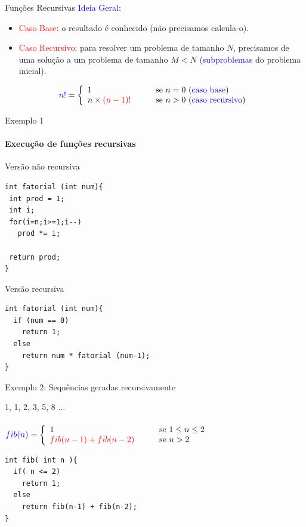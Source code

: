 \documentclass{beamer}
\newcommand{\blue}[1]{\textcolor{blue}{#1}}
\newcommand{\red}[1]{\textcolor{red}{#1}}
\begin{document}
\begin{frame}[fragile]{Funções Recursivas}
\blue{Ideia Geral}:
\begin{itemize}
 \item \red{Caso Base}: o resultado  é conhecido (não precisamos calcula-o).
 \item \red{Caso Recursivo}: para resolver um problema de tamanho $N$, precisamos de uma solução a um problema de tamanho $M<N$ (\blue{subproblemas} do problema inicial). 
\end{itemize}

\[\blue{n!} = 
 \left\{ \begin{array}{lll}
 1 & \quad& \mbox{se }n=0 \ (\mbox{\blue{caso base}})\\
 n \times \red{(n-1)!} & &\mbox{se }n > 0 \ (\mbox{\blue{caso recursivo}})
 \end{array}
 \right.\]
\end{frame}


\begin{frame}[fragile]{Exemplo 1}
\framesubtitle{Execução de funções recursivas}
Versão não recursiva
\begin{lstlisting}
int fatorial (int num){ 
 int prod = 1;
 int i;
 for(i=n;i>=1;i--)
   prod *= i;

 return prod;
}
\end{lstlisting}

Versão recursiva
\begin{lstlisting}
int fatorial (int num){ 
  if (num == 0) 
    return 1;  
  else 
    return num * fatorial (num-1);
}
\end{lstlisting}


\end{frame}


\begin{frame}[fragile]{Exemplo 2: Sequências geradas recursivamente}

1, 1, 2, 3, 5, 8 ... 
\ \\ \ \\
$\blue{fib(n)} = 
 \left\{ \begin{array}{lll}
 1 & \quad& \mbox{se } 1 \leq n \leq 2\\
 \red{fib(n-1) + fib(n-2)} & &\mbox{se }n > 2
 \end{array}
 \right.$
 
\begin{lstlisting}
int fib( int n ){
  if( n <= 2) 
    return 1;
  else
    return fib(n-1) + fib(n-2);
}
\end{lstlisting}


\end{frame}
\end{document}
